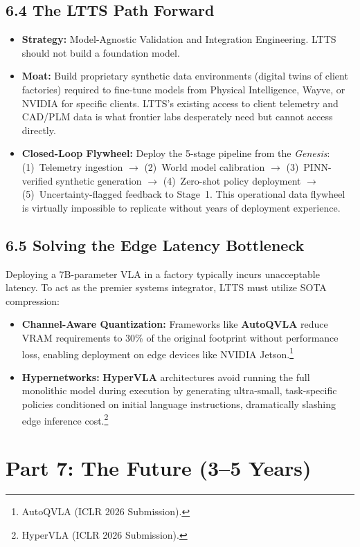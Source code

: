 \documentclass[11pt,a4paper]{article}
\begin{document}
\subsection{6.4 The LTTS Path Forward}
\begin{itemize}
    \item \textbf{Strategy:} Model-Agnostic Validation and Integration Engineering. LTTS should not build a foundation model.
    \item \textbf{Moat:} Build proprietary synthetic data environments (digital twins of client factories) required to fine-tune models from Physical Intelligence, Wayve, or NVIDIA for specific clients. LTTS's existing access to client telemetry and CAD/PLM data is what frontier labs desperately need but cannot access directly.
    \item \textbf{Closed-Loop Flywheel:} Deploy the 5-stage pipeline from the \textit{Genesis}: (1)~Telemetry ingestion $\rightarrow$ (2)~World model calibration $\rightarrow$ (3)~PINN-verified synthetic generation $\rightarrow$ (4)~Zero-shot policy deployment $\rightarrow$ (5)~Uncertainty-flagged feedback to Stage~1. This operational data flywheel is virtually impossible to replicate without years of deployment experience.
\end{itemize}

\subsection{6.5 Solving the Edge Latency Bottleneck}
Deploying a 7B-parameter VLA in a factory typically incurs unacceptable latency. To act as the premier systems integrator, LTTS must utilize SOTA compression:
\begin{itemize}
    \item \textbf{Channel-Aware Quantization:} Frameworks like \textbf{AutoQVLA} reduce VRAM requirements to 30\% of the original footprint without performance loss, enabling deployment on edge devices like NVIDIA Jetson.\footnote{AutoQVLA (ICLR 2026 Submission).}
    \item \textbf{Hypernetworks:} \textbf{HyperVLA} architectures avoid running the full monolithic model during execution by generating ultra-small, task-specific policies conditioned on initial language instructions, dramatically slashing edge inference cost.\footnote{HyperVLA (ICLR 2026 Submission).}
\end{itemize}

\section{Part 7: The Future (3--5 Years)}
\end{document}
